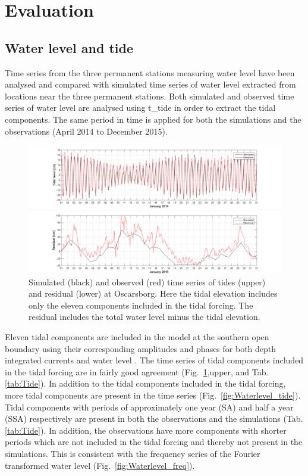 \newpage
\section{Evaluation}
\subsection{Water level and tide}

Time series from the three permanent stations measuring water level have been analysed and compared with simulated time series of water level extracted from locations near the three permanent stations. Both simulated and observed time series of water level are analysed using t\_tide \citep{pavlo:etal:2002} in order to extract the tidal components. The same period in time is applied for both the simulations and the observations (April 2014 to December 2015). 

\begin{figure}[hb] 
\centerline{ 
\includegraphics*[trim=3cm 0cm 2.5cm 0cm,clip=true,width=\textwidth]{Figurer/Oscarsborg_Tide_selected_jan15}  
} 
\centerline{ 
\includegraphics*[trim=3cm 0cm 2.5cm 0cm,clip=true,width=\textwidth]{Figurer/Oscarsborg_WL_rest_jan15} 
} 
\caption{\small 
Simulated (black) and observed (red) time series of tides (upper) and residual (lower) at Oscarsborg. Here the tidal elevation includes only the eleven components included in the tidal forcing. The residual includes the total water level minus the tidal elevation.} 
\label{fig:Waterlevel_jan15} 
\end{figure} 

Eleven tidal components are included in the model at the southern open boundary using their corresponding amplitudes and phases for both depth integrated currents and water level \citep{roed:etal:2016}. The time series of tidal components included in the tidal forcing are in fairly good agreement (Fig.~\ref{fig:Waterlevel_jan15},upper, and Tab.\-\ref{tab:Tide}). In addition to the tidal components included in the tidal forcing, more tidal components are present in the time series (Fig.~\ref{fig:Waterlevel_tide}). Tidal components with periods of approximately one year (SA) and half a year (SSA) respectively are present in both the observations and the simulations (Tab.\-\ref{tab:Tide}). In addition, the observations have more components with shorter periods which are not included in the tidal forcing and thereby not present in the simulations. This is consistent with the frequency series of the Fourier transformed water level (Fig.~\ref{fig:Waterlevel_freq}).

